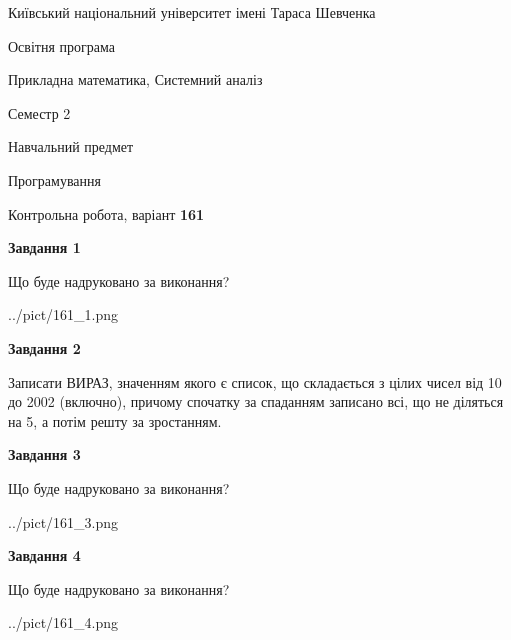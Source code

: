 \documentclass[12pt, ukrainian]{article}
\begin{document}
{{\begin {small}\par
{ \center  Київський національний університет імені Тараса Шевченка \par}
{\parbox {5 cm}{Освітня програма \hfill}{\parbox {8 cm}{Прикладна математика, Системний аналіз \hfill}}\parbox {5 cm}{\hfill Семестр 2}}\par
{\parbox {5 cm} {Навчальний предмет \hfill}\parbox {7 cm}{Програмування \hfill}\parbox {6cm}{\hfill}\par}\vspace{-7pt} \end{small}}{\center Контрольна робота, варіант  \No \textbf
{ 161 }\par}}
{
\begin {large}
{\begin {center}\textbf{Завдання 1}\end {center}}\par
Що буде надруковано за виконання?\par\par
\begin{center}
	{../pict/161_1.png}
\end{center}
\newpage

{\begin {center}\textbf{Завдання 2}\end {center}}\par

Записати ВИРАЗ, значенням якого є список, що складається з цілих чисел від 10 до 2002 (включно), причому спочатку за спаданням записано всі, що не діляться на 5, а потім решту за зростанням.\par
\newpage

{\begin {center}\textbf{Завдання 3}\end {center}}\par
Що буде надруковано за виконання?
\begin{center}
	{../pict/161_3.png}
\end{center}
\newpage

{\begin {center}\textbf{Завдання 4}\end {center}}\par
Що буде надруковано за виконання?\par
\begin{center}
	{../pict/161_4.png}
\end{center}
\newpage


\end{large}}
\end{document}
